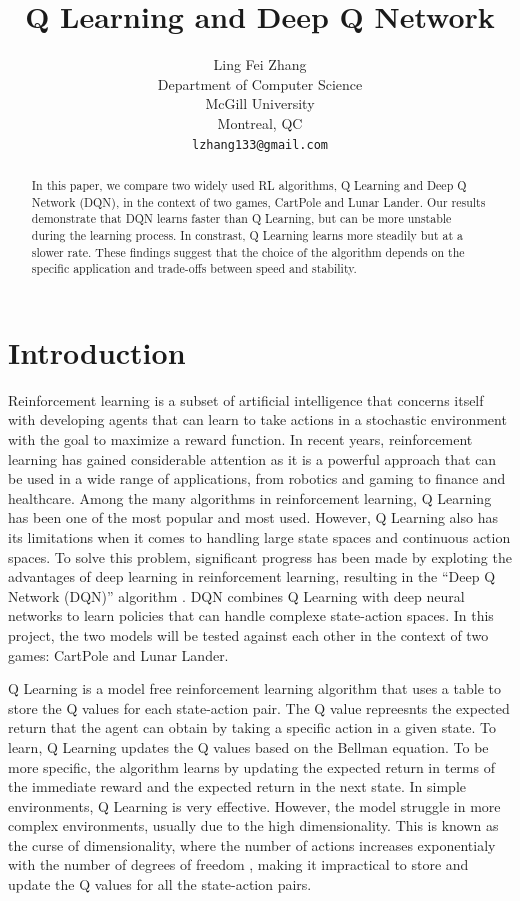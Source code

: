 \documentclass{article}
\title{Q Learning and Deep Q Network}
\author{%
      Ling Fei Zhang\\
      Department of Computer Science\\ McGill University\\ Montreal, QC \\
      \texttt{lzhang133@gmail.com} \\
}
\begin{document}
\maketitle

\begin{abstract}
      In this paper, we compare two widely used RL algorithms, Q Learning and Deep Q Network (DQN), in the context of two games, CartPole and Lunar Lander. Our results demonstrate that DQN learns faster than Q Learning, but can be more unstable during the learning process. In constrast, Q Learning learns more steadily but at a slower rate. These findings suggest that the choice of the algorithm depends on the specific application and trade-offs between speed and stability.
\end{abstract}

\section{Introduction}

Reinforcement learning is a subset of artificial intelligence that concerns
itself with developing agents that can learn to take actions in a stochastic
environment with the goal to maximize a reward function. In recent years,
reinforcement learning has gained considerable attention as it is a powerful
approach that can be used in a wide range of applications, from robotics and
gaming to finance and healthcare. Among the many algorithms in reinforcement
learning, Q Learning has been one of the most popular and most used. However, Q
Learning also has its limitations when it comes to handling large state spaces
and continuous action spaces. To solve this problem, significant progress has
been made by exploting the advantages of deep learning in reinforcement
learning, resulting in the ``Deep Q Network (DQN)'' algorithm
\cite{DBLP:journals/corr/MnihKSGAWR13}. DQN combines Q Learning with deep
neural networks to learn policies that can handle complexe state-action spaces.
In this project, the two models will be tested against each other in the
context of two games: CartPole and Lunar Lander.

Q Learning is a model free reinforcement learning algorithm that uses a table
to store the Q values for each state-action pair. The Q value repreesnts the
expected return that the agent can obtain by taking a specific action in a
given state. To learn, Q Learning updates the Q values based on the Bellman
equation. To be more specific, the algorithm learns by updating the expected
return in terms of the immediate reward and the expected return in the next
state. In simple environments, Q Learning is very effective. However, the model
struggle in more complex environments, usually due to the high dimensionality.
This is known as the curse of dimensionality, where the number of actions
increases exponentialy with the number of degrees of freedom
\cite{soft_update}, making it impractical to store and update the Q values for
all the state-action pairs.
\end{document}
